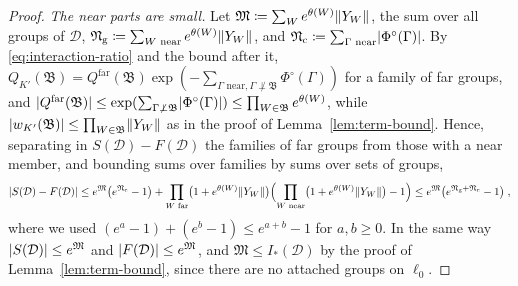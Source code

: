 \documentclass[11pt]{preprint}
\DeclarePairedDelimiter{\abs}{\lvert}{\rvert}
\DeclarePairedDelimiter{\norm}{\lVert}{\rVert}
\numberwithin{equation}{section}
\theoremstyle{definition}
\theoremstyle{remark}
\theoremstyle{plain}
\begin{document}
\begin{proof}
\emph{The near parts are small.} Let $\mathfrak M \coloneqq \sum_We^{\theta(W)}\norm{Y_W}$, the sum over all groups of $\mathcal D$, $\mathfrak N_{\mathrm g} \coloneqq \sum_{W \text{ near}}e^{\theta(W)}\norm{Y_W}$, and $\mathfrak N_{\mathrm c} \coloneqq \sum_{\Gamma \text{ near}}\abs{\Phi^\circ(\Gamma)}$. By \eqref{eq:interaction-ratio} and the bound after it, $Q_{K'}(\mathfrak B) = Q^{\mathrm{far}}(\mathfrak B)\exp(-\sum_{\Gamma \text{ near}, \Gamma \not\perp \mathfrak B}\Phi^\circ(\Gamma))$ for a family of far groups, and $\abs{Q^{\mathrm{far}}(\mathfrak B)} \leq \exp(\sum_{\Gamma \not\perp \mathfrak B}\abs{\Phi^\circ(\Gamma)}) \leq \prod_{W \in \mathfrak B}e^{\theta(W)}$, while $\abs{w_{K'}(\mathfrak B)} \leq \prod_{W \in \mathfrak B}\norm{Y_W}$ as in the proof of Lemma~\ref{lem:term-bound}. Hence, separating in $S(\mathcal D) - F(\mathcal D)$ the families of far groups from those with a near member, and bounding sums over families by sums over sets of groups,
\begin{equation}\label{eq:near-difference}
    \abs{S(\mathcal D) - F(\mathcal D)} \leq e^{\mathfrak M}\bigl(e^{\mathfrak N_{\mathrm c}} - 1\bigr) + \prod_{W \text{ far}}\bigl(1 + e^{\theta(W)}\norm{Y_W}\bigr)\Bigl(\prod_{W \text{ near}}\bigl(1 + e^{\theta(W)}\norm{Y_W}\bigr) - 1\Bigr) \leq e^{\mathfrak M}\bigl(e^{\mathfrak N_{\mathrm g} + \mathfrak N_{\mathrm c}} - 1\bigr)\;,
\end{equation}
where we used $(e^a - 1) + (e^b - 1) \leq e^{a+b} - 1$ for $a, b \geq 0$. In the same way $\abs{S(\mathcal D)} \leq e^{\mathfrak M}$ and $\abs{F(\mathcal D)} \leq e^{\mathfrak M}$, and $\mathfrak M \leq I_*(\mathcal D)$ by the proof of Lemma~\ref{lem:term-bound}, since there are no attached groups on $\ell_0$.


\end{proof}
\end{document}
